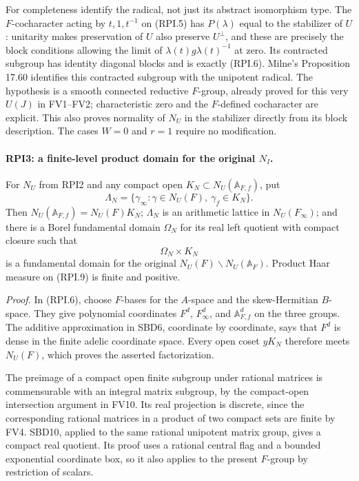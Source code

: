 For completeness identify the radical, not just its abstract
isomorphism type.  The \(F\)-cocharacter acting by \(t,1,t^{-1}\)
on (RPI.5) has \(P(\lambda)\) equal to the stabilizer of \(U\):
unitarity makes preservation of \(U\) also preserve \(U^\perp\),
and these are precisely the block conditions allowing the limit
of \(\lambda(t)g\lambda(t)^{-1}\) at zero.  Its contracted subgroup
has identity diagonal blocks and is exactly (RPI.6).
Milne's Proposition 17.60 identifies this contracted subgroup
with the unipotent radical.  The hypothesis is a smooth connected
reductive \(F\)-group, already proved for this very \(U(J)\) in
FV1--FV2; characteristic zero and the \(F\)-defined cocharacter
are explicit.  This also proves normality of \(N_U\) in the
stabilizer directly from its block description.  The cases \(W=0\)
and \(r=1\) require no modification.

\paragraph{RPI3: a finite-level product domain for the original \(N_I\).}
\label{claim:RPI3}
For \(N_U\) from RPI2 and any compact open
\(K_N\subset N_U(\mathbb A_{F,f})\), put
\[
 \Lambda_N=\{\gamma_\infty:\gamma\in N_U(F),\
                                      \gamma_f\in K_N\}.
 \tag{RPI.8}
\]
Then \(N_U(\mathbb A_{F,f})=N_U(F)K_N\);
\(\Lambda_N\) is an arithmetic lattice in \(N_U(F_\infty)\);
and there is a Borel fundamental domain \(\Omega_N\) for its real
left quotient with compact closure such that
\[
                 \Omega_N\times K_N
 \tag{RPI.9}
\]
is a fundamental domain for the original
\(N_U(F)\backslash N_U(\mathbb A_F)\).
Product Haar measure on (RPI.9) is finite and positive.

\emph{Proof.}
In (RPI.6), choose \(F\)-bases for the \(A\)-space and the
skew-Hermitian \(B\)-space.  They give polynomial coordinates
\(F^d\), \(F_\infty^d\), and \(\mathbb A_{F,f}^d\) on the three
groups.  The additive approximation in SBD6, coordinate by
coordinate, says that \(F^d\) is dense in the finite adelic
coordinate space.  Every open coset \(yK_N\) therefore meets
\(N_U(F)\), which proves the asserted factorization.

The preimage of a compact open finite subgroup under rational
matrices is commensurable with an integral matrix subgroup, by
the compact-open intersection argument in FV10.  Its real
projection is discrete, since the corresponding rational matrices
in a product of two compact sets are finite by FV4.
SBD10, applied to the same rational unipotent matrix group,
gives a compact real quotient.  Its proof uses a rational central
flag and a bounded exponential coordinate box, so it also applies
to the present \(F\)-group by restriction of scalars.

